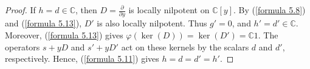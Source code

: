 \documentclass[12pt,reqno]{amsart}
\numberwithin{equation}{section}
\begin{document}
\begin{proof}
If $h=d\in\mathbb C$, then $D=\frac{\partial}{\partial{y}}$ is locally nilpotent on $\mathbb C[y]$. By (\ref{formula 5.8}) and (\ref{formula 5.13}), $D'$ is also locally nilpotent. Thus $g'=0$, and $h'=d'\in\mathbb C$. Moreover, (\ref{formula 5.13}) gives $\varphi(\ker (D))=\ker (D')=\mathbb C1$. The operators $s+yD$ and $s'+yD'$ act on these kernels by the scalars $d$ and $d'$, respectively. Hence, (\ref{formula 5.11}) gives $h=d=d'=h'$. 




\end{proof}
\end{document}
